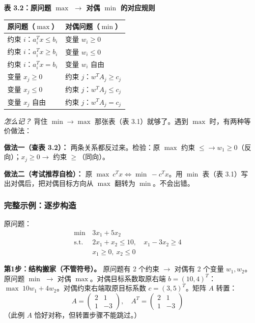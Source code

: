 \medskip
\textbf{表 3.2：原问题 $\max$ $\to$ 对偶 $\min$ 的对应规则}

\medskip
\begin{tabular}{@{}ll@{}}
\toprule
\textbf{原问题（$\max$）} & \textbf{对偶问题（$\min$）} \\
\midrule
约束 $i$：$a_i^T x \le b_i$ & 变量 $w_i \ge 0$ \\
约束 $i$：$a_i^T x \ge b_i$ & 变量 $w_i \le 0$ \\
约束 $i$：$a_i^T x = b_i$  & 变量 $w_i$ 自由 \\[3pt]
变量 $x_j \ge 0$  & 约束 $j$：$w^T A_j \ge c_j$ \\
变量 $x_j \le 0$  & 约束 $j$：$w^T A_j \le c_j$ \\
变量 $x_j$ 自由   & 约束 $j$：$w^T A_j = c_j$ \\
\bottomrule
\end{tabular}

\medskip
\textit{怎么记？} 背住 $\min\to\max$ 那张表（表 3.1）就够了。遇到 $\max$ 时，有两种等价做法：

\textbf{做法一（查表 3.2）：} 两条关系都反过来。检验：原 $\max$ 约束 $\le \to w_1\ge0$（反向）；$x_j\ge0 \to$ 约束 $\ge$（同向）。

\textbf{做法二（考试推荐自检）：} 原 $\max\ c^T x \iff \min\ -c^T x$。用 $\min$ 表（表 3.1）写出对偶后，把对偶目标方向从 $\max$ 翻转为 $\min$。不会出错。

\medskip
\subsubsection{完整示例：逐步构造}

原问题：
\[
\begin{aligned}
\min\ & 3x_1 + 5x_2 \\
\text{s.t.}\ & 2x_1 + x_2 \le 10,\quad x_1 - 3x_2 \ge 4 \\
& x_1 \ge 0,\ x_2 \le 0
\end{aligned}
\]

\textbf{第1步：结构搬家（不管符号）。} 原问题有 2 个约束 $\to$ 对偶有 2 个变量 $w_1,w_2$。原问题 $\min$ $\to$ 对偶 $\max$。对偶目标系数取原右端 $b=(10,4)^T$：$\max\; 10w_1 + 4w_2$。对偶约束右端取原目标系数 $c=(3,5)^T$。矩阵 $A$ 转置：
\[
A = \begin{pmatrix}2&1\\1&-3\end{pmatrix},\quad
A^T = \begin{pmatrix}2&1\\1&-3\end{pmatrix}
\]
（此例 $A$ 恰好对称，但转置步骤不能跳过。）

